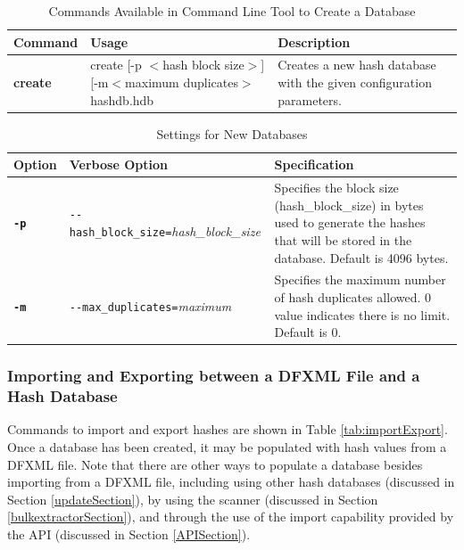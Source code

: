 \documentclass[11pt,fleqn]{article} %
\begin{document}
\begin{table}[!ht]
\centering
\caption{Commands Available in \hash Command Line Tool to Create a Database}
\label{tab:createDatabase}
\begin{tabular}{|p{2.5 cm}|p{7 cm}|p{4 cm}|}
\hline \hline
\textbf{Command} & \textbf{Usage} & \textbf{Description} \\
\hline
\textbf{create} & create [-p $<$hash block size$>$] [-m$<$maximum duplicates$>$ hashdb.hdb & Creates a new hash database with the given configuration parameters.\\
\hline
\end{tabular}
\end{table}


\begin{table}[!ht]

\centering
\caption{Settings for New Databases}
\label{tab:hashDBSettings}
\begin{tabular}{|p{1.5 cm}|p{8 cm}|p{4 cm}|}
\hline \hline
\textbf{Option} & \textbf{Verbose Option} & \textbf{Specification} \\
\hline
\textbf{\texttt{-p}} & \verb+--hash_block_size=+\textit{hash\_block\_size} & Specifies the block size (hash\_block\_size) in bytes used to generate the hashes that will be stored in the database. Default is 4096 bytes.  \\
\hline
\textbf{\texttt{-m}} & \verb+--max_duplicates=+\textit{maximum} & Specifies the maximum number of hash duplicates allowed. 0 value indicates there is no limit. Default is 0.\\
\hline
\end{tabular}
\end{table}

\subsubsection{Importing and Exporting between a DFXML File and a Hash Database}
Commands to import and export hashes are shown in Table \ref{tab:importExport}.
Once a database has been created, it may be populated with hash values from a DFXML file.
Note that there are other ways to populate a database besides importing from a DFXML file, including using other hash databases (discussed in Section \ref{updateSection}),
by using the \bulk \hash scanner (discussed in Section \ref{bulkextractorSection}),
and through the use of the import capability provided by the API (discussed in Section \ref{APISection}). \\
\end{document}
